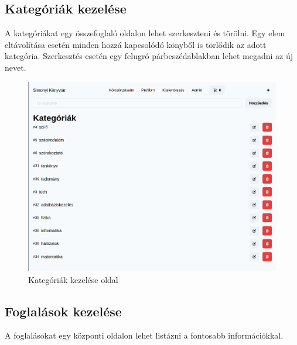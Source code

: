\subsection{Kategóriák kezelése}

A kategóriákat egy összefoglaló oldalon lehet szerkeszteni és törölni. Egy elem eltávolítása esetén
minden hozzá kapcsolódó könyből is törlődik az adott kategória. Szerkesztés esetén egy felugró párbeszédablakban lehet
megadni az új nevet.

\begin{figure}[!ht]
  \centering
  \includegraphics[width=150mm, keepaspectratio]{figures/category-admin-list.png}
  \caption{Kategóriák kezelése oldal}
  \label{fig:CategoryAdmin}
\end{figure}

\subsection{Foglalások kezelése}

A foglalásokat egy központi oldalon lehet listázni a fontosabb információkkal.

